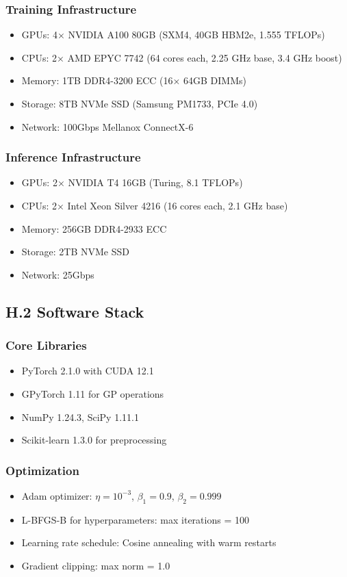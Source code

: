 \documentclass[12pt]{article}
\begin{document}
\subsubsection{Training Infrastructure}
\begin{itemize}
\item GPUs: 4× NVIDIA A100 80GB (SXM4, 40GB HBM2e, 1.555 TFLOPs)
\item CPUs: 2× AMD EPYC 7742 (64 cores each, 2.25 GHz base, 3.4 GHz boost)
\item Memory: 1TB DDR4-3200 ECC (16× 64GB DIMMs)
\item Storage: 8TB NVMe SSD (Samsung PM1733, PCIe 4.0)
\item Network: 100Gbps Mellanox ConnectX-6
\end{itemize}

\subsubsection{Inference Infrastructure}
\begin{itemize}
\item GPUs: 2× NVIDIA T4 16GB (Turing, 8.1 TFLOPs)
\item CPUs: 2× Intel Xeon Silver 4216 (16 cores each, 2.1 GHz base)
\item Memory: 256GB DDR4-2933 ECC
\item Storage: 2TB NVMe SSD
\item Network: 25Gbps
\end{itemize}

\subsection{H.2 Software Stack}

\subsubsection{Core Libraries}
\begin{itemize}
\item PyTorch 2.1.0 with CUDA 12.1
\item GPyTorch 1.11 for GP operations
\item NumPy 1.24.3, SciPy 1.11.1
\item Scikit-learn 1.3.0 for preprocessing
\end{itemize}

\subsubsection{Optimization}
\begin{itemize}
\item Adam optimizer: $\eta = 10^{-3}$, $\beta_1 = 0.9$, $\beta_2 = 0.999$
\item L-BFGS-B for hyperparameters: max iterations = 100
\item Learning rate schedule: Cosine annealing with warm restarts
\item Gradient clipping: max norm = 1.0
\end{itemize}
\end{document}
